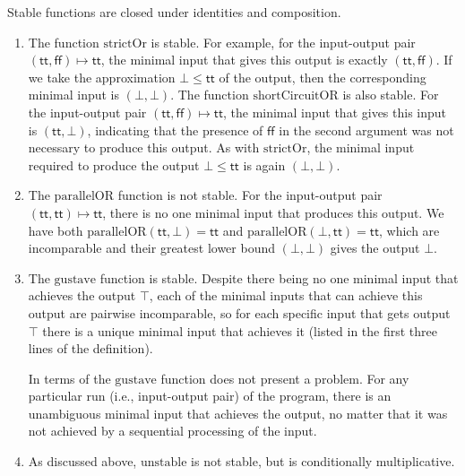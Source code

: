 \begin{lemma}
  Stable functions are closed under identities and composition.
\end{lemma}

\begin{example}
  \begin{enumerate}
  \item The function $\mathrm{strictOr}$ is stable. For example, for the input-output pair $(\mathsf{tt},\mathsf{ff}) \mapsto \mathsf{tt}$, the minimal input that gives this output is exactly $(\mathsf{tt}, \mathsf{ff})$. If we take the approximation $\bot \leq \mathsf{tt}$ of the output, then the corresponding minimal input is $(\bot, \bot)$. The function $\mathrm{shortCircuitOR}$ is also stable. For the input-output pair $(\mathsf{tt},\mathsf{ff}) \mapsto \mathsf{tt}$, the minimal input that gives this input is $(\mathsf{tt},\bot)$, indicating that the presence of $\mathsf{ff}$ in the second argument was not necessary to produce this output. As with $\mathrm{strictOr}$, the minimal input required to produce the output $\bot \leq \mathsf{tt}$ is again $(\bot,\bot)$.

  \item The $\mathrm{parallelOR}$ function is not stable. For the input-output pair $(\mathsf{tt},\mathsf{tt}) \mapsto \mathsf{tt}$, there is no one minimal input that produces this output. We have both $\mathrm{parallelOR}(\mathsf{tt},\bot) = \mathsf{tt}$ and $\mathrm{parallelOR}(\bot,\mathsf{tt}) = \mathsf{tt}$, which are incomparable and their greatest lower bound $(\bot,\bot)$ gives the output $\bot$.

  \item The $\mathrm{gustave}$ function is stable. Despite there being no one minimal input that achieves the output $\top$, each of the minimal inputs that can achieve this output are pairwise incomparable, so for each specific input that gets output $\top$ there is a unique minimal input that achieves it (listed in the first three lines of the definition).

    In terms of \GPS the $\mathrm{gustave}$ function does not present a problem. For any particular run (i.e., input-output pair) of the program, there is an unambiguous minimal input that achieves the output, no matter that it was not achieved by a sequential processing of the input.

  \item As discussed above, $\mathrm{unstable}$ is not stable, but is conditionally multiplicative.
  \end{enumerate}
\end{example}

